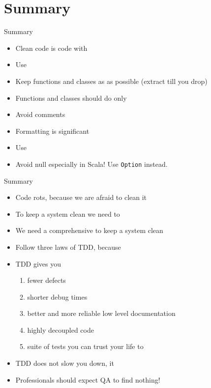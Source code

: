 \section{Summary}
\begin{frame}{Summary}
\begin{itemize}
  \item Clean code is code with 
  \item Use 
  \item Keep functions and classes as  as possible (extract
  till you drop)
  \item Functions and classes should do only 
  \item Avoid \alert{comments}
  \item Formatting is significant
  \item Use 
  \item Avoid \alert{null} especially in Scala! Use \lstinline!Option! instead.
\end{itemize}
\end{frame}

\begin{frame}{Summary}
\begin{itemize}
  \item Code \alert{rots}, because we are afraid to clean it
  \item To keep a system clean we need to 
  \item We need a comprehensive  to keep a system
  clean
  \item Follow three laws of TDD, because 
  \item TDD gives you
  \begin{enumerate}
    \item fewer defects
    \item shorter debug times
    \item better and more reliable low level documentation
    \item highly decoupled code
    \item suite of tests you can trust your life to
  \end{enumerate}
  \item TDD does not slow you down, it 
  \item Professionals should expect QA to find nothing!
\end{itemize}
\end{frame}